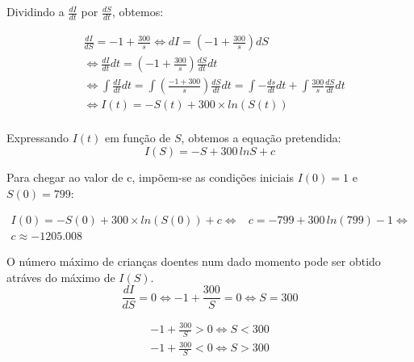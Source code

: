 \documentclass[portuguese, a4paper]{article}
\begin{document}
	\subsection{}
		\subsubsection{}
		\par %
		\par
		Dividindo a $\frac{dI}{dt}$ por $\frac{dS}{dt}$, obtemos:

		\begin{equation} \label{di}
		\begin{split}
			& \frac{dI}{dS} = -1 + \frac{300}{s}
			\Leftrightarrow dI = \left(-1 + \frac{300}{s}\right)dS   \\ 
			& \Leftrightarrow \frac{dI}{dt} dt = \left( -1 + \frac{300}{s}\right) \frac{dS}{dt} dt \\ 
			& \Leftrightarrow \int\frac{dI}{dt}dt = \int\left(\frac{-1 + 300}{s}\right)\frac{dS}{dt}dt =
			\int - \frac{ds}{dt}dt + \int\frac{300}{s}\frac{dS}{dt}dt \\
			& \Leftrightarrow I(t) = -S(t) + 300 \times ln(S(t)) \\
		\end{split}
		\end{equation}

		Expressando $I(t)$ em função de $S$, obtemos a equação pretendida:
        $$I(S) = -S + 300\, ln S + c$$

		\vspace{5mm}
		Para chegar ao valor de c, impõem-se as condições iniciais $I(0) = 1$ e $S(0) = 799$:

		\begin{equation}
		\begin{split}
		I(0) = -S(0) + 300 \times ln(S(0)) + c \Leftrightarrow & c = -799 +
		300\,ln(799) - 1 \Leftrightarrow \\
		c \approx -1205.008
		\end{split}
		\end{equation}


		O número máximo de crianças doentes num dado momento pode ser obtido
		atráves do máximo de $I(S)$. 
		\begin{equation}
			\label{eq:root}
			\frac{dI}{dS} = 0 \Leftrightarrow -1 + \frac{300}{S} = 0
			\Leftrightarrow S = 300
		\end{equation}

		\begin{equation}
		\begin{split}
			\label{eq:comp}
			 -1 + \frac{300}{S} > 0 \Leftrightarrow S < 300 \\
			 -1 + \frac{300}{S} < 0 \Leftrightarrow S > 300
		\end{split}
		\end{equation}
\end{document}
